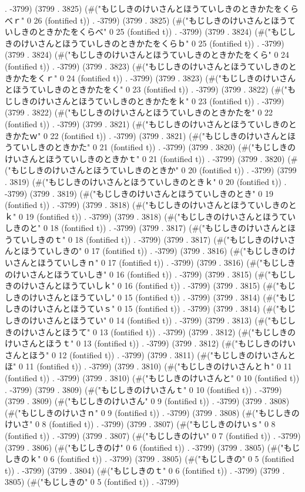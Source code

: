 . -3799) (3799 . 3825) (#("もじしきのけいさんとほうていしきのときかたをくらべｒ" 0 26 (fontified t)) . -3799) (3799 . 3825) (#("もじしきのけいさんとほうていしきのときかたをくらべ" 0 25 (fontified t)) . -3799) (3799 . 3824) (#("もじしきのけいさんとほうていしきのときかたをくらｂ" 0 25 (fontified t)) . -3799) (3799 . 3824) (#("もじしきのけいさんとほうていしきのときかたをくら" 0 24 (fontified t)) . -3799) (3799 . 3823) (#("もじしきのけいさんとほうていしきのときかたをくｒ" 0 24 (fontified t)) . -3799) (3799 . 3823) (#("もじしきのけいさんとほうていしきのときかたをく" 0 23 (fontified t)) . -3799) (3799 . 3822) (#("もじしきのけいさんとほうていしきのときかたをｋ" 0 23 (fontified t)) . -3799) (3799 . 3822) (#("もじしきのけいさんとほうていしきのときかたを" 0 22 (fontified t)) . -3799) (3799 . 3821) (#("もじしきのけいさんとほうていしきのときかたｗ" 0 22 (fontified t)) . -3799) (3799 . 3821) (#("もじしきのけいさんとほうていしきのときかた" 0 21 (fontified t)) . -3799) (3799 . 3820) (#("もじしきのけいさんとほうていしきのときかｔ" 0 21 (fontified t)) . -3799) (3799 . 3820) (#("もじしきのけいさんとほうていしきのときか" 0 20 (fontified t)) . -3799) (3799 . 3819) (#("もじしきのけいさんとほうていしきのときｋ" 0 20 (fontified t)) . -3799) (3799 . 3819) (#("もじしきのけいさんとほうていしきのとき" 0 19 (fontified t)) . -3799) (3799 . 3818) (#("もじしきのけいさんとほうていしきのとｋ" 0 19 (fontified t)) . -3799) (3799 . 3818) (#("もじしきのけいさんとほうていしきのと" 0 18 (fontified t)) . -3799) (3799 . 3817) (#("もじしきのけいさんとほうていしきのｔ" 0 18 (fontified t)) . -3799) (3799 . 3817) (#("もじしきのけいさんとほうていしきの" 0 17 (fontified t)) . -3799) (3799 . 3816) (#("もじしきのけいさんとほうていしきｎ" 0 17 (fontified t)) . -3799) (3799 . 3816) (#("もじしきのけいさんとほうていしき" 0 16 (fontified t)) . -3799) (3799 . 3815) (#("もじしきのけいさんとほうていしｋ" 0 16 (fontified t)) . -3799) (3799 . 3815) (#("もじしきのけいさんとほうていし" 0 15 (fontified t)) . -3799) (3799 . 3814) (#("もじしきのけいさんとほうていｓ" 0 15 (fontified t)) . -3799) (3799 . 3814) (#("もじしきのけいさんとほうてい" 0 14 (fontified t)) . -3799) (3799 . 3813) (#("もじしきのけいさんとほうて" 0 13 (fontified t)) . -3799) (3799 . 3812) (#("もじしきのけいさんとほうｔ" 0 13 (fontified t)) . -3799) (3799 . 3812) (#("もじしきのけいさんとほう" 0 12 (fontified t)) . -3799) (3799 . 3811) (#("もじしきのけいさんとほ" 0 11 (fontified t)) . -3799) (3799 . 3810) (#("もじしきのけいさんとｈ" 0 11 (fontified t)) . -3799) (3799 . 3810) (#("もじしきのけいさんと" 0 10 (fontified t)) . -3799) (3799 . 3809) (#("もじしきのけいさんｔ" 0 10 (fontified t)) . -3799) (3799 . 3809) (#("もじしきのけいさん" 0 9 (fontified t)) . -3799) (3799 . 3808) (#("もじしきのけいさｎ" 0 9 (fontified t)) . -3799) (3799 . 3808) (#("もじしきのけいさ" 0 8 (fontified t)) . -3799) (3799 . 3807) (#("もじしきのけいｓ" 0 8 (fontified t)) . -3799) (3799 . 3807) (#("もじしきのけい" 0 7 (fontified t)) . -3799) (3799 . 3806) (#("もじしきのけ" 0 6 (fontified t)) . -3799) (3799 . 3805) (#("もじしきのｋ" 0 6 (fontified t)) . -3799) (3799 . 3805) (#("もじしきの" 0 5 (fontified t)) . -3799) (3799 . 3804) (#("もじしきのｔ" 0 6 (fontified t)) . -3799) (3799 . 3805) (#("もじしきの" 0 5 (fontified t)) . -3799) 